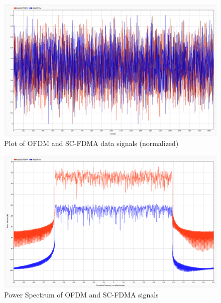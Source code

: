 \documentclass[a4paper]{article}
\begin{document}
\begin{figure}[hbt!]
    \centering
  \includegraphics[width=\linewidth]{ofdm_scfdma_data}
  \caption{Plot of OFDM and SC-FDMA data signals (normalized)}
\end{figure}
\begin{figure}[hbt!]
    \centering
  \includegraphics[width=\linewidth]{ofdm_scfdma_spectrum}
  \caption{Power Spectrum of OFDM and SC-FDMA signals}
\end{figure}
\end{document}
